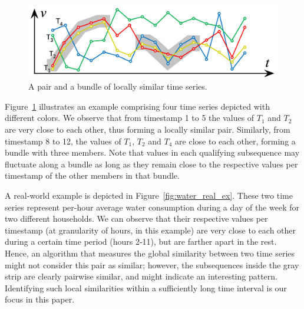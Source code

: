 \begin{figure}[b]
    \centering
    \includegraphics[width=\columnwidth]{figures/pair_flock_ex.png}
    \caption{A pair and a bundle of locally similar time series.}
    \label{fig:pair_flock_ex}
\end{figure}

Figure~\ref{fig:pair_flock_ex} illustrates an example comprising four time series depicted with different colors. We observe that from timestamp 1 to 5 the values of $T_1$ and $T_2$ are very close to each other, thus forming a locally similar pair. Similarly, from timestamp 8 to 12, the values of $T_1$, $T_2$ and $T_4$ are close to each other, forming a bundle with three members. Note that values in each qualifying subsequence may fluctuate along a bundle as long as they remain close to the respective values per timestamp of the other members in that bundle.

A real-world example is depicted in Figure~\ref{fig:water_real_ex}. These two time series represent per-hour average water consumption during a day of the week for two different households. We can observe that their respective values per timestamp (at granularity of hours, in this example) are very close to each other during a certain time period (hours 2-11), but are farther apart in the rest. Hence, an algorithm that measures the global similarity between two time series might not consider this pair as similar; however, the subsequences inside the gray strip are clearly pairwise similar, and might indicate an interesting pattern. Identifying such local similarities within a sufficiently long time interval is our focus in this paper.




